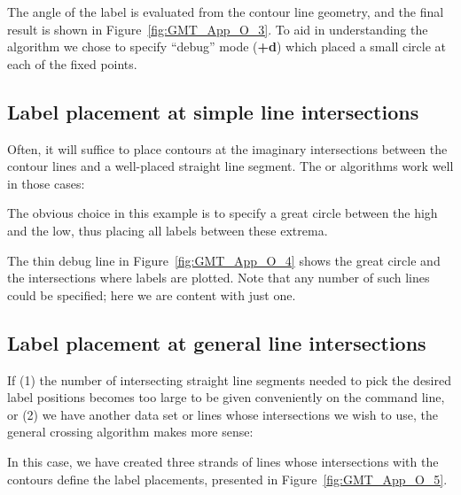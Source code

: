 
\noindent
The angle of the label is evaluated from the contour line geometry, and the final result
is shown in Figure~\ref{fig:GMT_App_O_3}.
To aid in understanding the algorithm we chose to specify ``debug'' mode ({\bf +d}) which placed a
small circle at each of the fixed points.

\subsection{Label placement at simple line intersections}

Often, it will suffice to place contours at the imaginary intersections between the
contour lines and a well-placed straight line segment.  The  or 
algorithms work well in those cases:


\noindent
The obvious choice in this example is to specify a great circle between the high and
the low, thus placing all labels between these extrema.

\noindent
The thin debug line in Figure~\ref{fig:GMT_App_O_4} shows the great circle and the
intersections where labels are plotted.  Note that any number of such lines could be specified;
here we are content with just one.

\subsection{Label placement at general line intersections}

If (1) the number of intersecting straight line segments needed to pick the desired label
positions becomes too large to be given conveniently on the command line, or (2) we have
another data set or lines whose intersections we wish to use, the general crossing
algorithm makes more sense:



\noindent
In this case, we have created three strands of lines whose intersections with the contours
define the label placements, presented in Figure~\ref{fig:GMT_App_O_5}.

